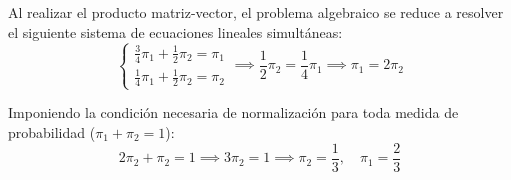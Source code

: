 \begin{ejemplo}
    \noindent Al realizar el producto matriz-vector, el problema algebraico se reduce a resolver el siguiente sistema de ecuaciones lineales simultáneas:
    \begin{equation*}
        \begin{cases} 
            \frac{3}{4}\pi_1 + \frac{1}{2}\pi_2 = \pi_1 \\[0.2cm] 
            \frac{1}{4}\pi_1 + \frac{1}{2}\pi_2 = \pi_2 
        \end{cases} 
        \implies \frac{1}{2}\pi_2 = \frac{1}{4}\pi_1 \implies \pi_1 = 2\pi_2
    \end{equation*}

    \noindent Imponiendo la condición necesaria de normalización para toda medida de probabilidad ($\pi_1 + \pi_2 = 1$):\
    \begin{equation*}
        2\pi_2 + \pi_2 = 1 \implies 3\pi_2 = 1 \implies \pi_2 = \frac{1}{3}, \quad \pi_1 = \frac{2}{3}
    \end{equation*}
\end{ejemplo}

